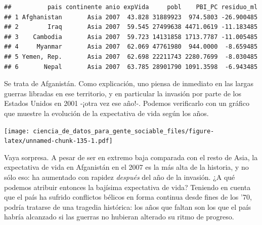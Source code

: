 \documentclass[spanish,]{book}
\newenvironment{Shaded}{\begin{snugshade}}{\end{snugshade}}
\newcommand{\DataTypeTok}[1]{\textcolor[rgb]{0.13,0.29,0.53}{#1}}
\newcommand{\KeywordTok}[1]{\textcolor[rgb]{0.13,0.29,0.53}{\textbf{#1}}}
\newcommand{\NormalTok}[1]{#1}
\newcommand{\OperatorTok}[1]{\textcolor[rgb]{0.81,0.36,0.00}{\textbf{#1}}}
\newcommand{\StringTok}[1]{\textcolor[rgb]{0.31,0.60,0.02}{#1}}
\begin{document}
\begin{verbatim}
##          pais continente anio expVida     pobl    PBI_PC residuo_ml
## 1 Afghanistan       Asia 2007  43.828 31889923  974.5803 -26.900485
## 2        Iraq       Asia 2007  59.545 27499638 4471.0619 -11.183485
## 3    Cambodia       Asia 2007  59.723 14131858 1713.7787 -11.005485
## 4     Myanmar       Asia 2007  62.069 47761980  944.0000  -8.659485
## 5 Yemen, Rep.       Asia 2007  62.698 22211743 2280.7699  -8.030485
## 6       Nepal       Asia 2007  63.785 28901790 1091.3598  -6.943485
\end{verbatim}

Se trata de Afganistán. Como explicación, uno piensa de inmediato en las largas guerras libradas en ese territorio, y en particular la invasión por parte de los Estados Unidos en 2001 -¡otra vez ese año!-. Podemos verificarlo con un gráfico que muestre la evolución de la expectativa de vida según los años.

\begin{Shaded}
\end{Shaded}

\texttt{[image: ciencia\_de\_datos\_para\_gente\_sociable\_files/figure-latex/unnamed-chunk-135-1.pdf]}

Vaya sorpresa. A pesar de ser en extremo baja comparada con el resto de Asia, la expectativa de vida en Afganistán en el 2007 es la más alta de la historia, y no sólo eso: ha aumentado con rapidez \emph{después} del año de la invasión. ¿A qué podemos atribuir entonces la bajísima expectativa de vida? Teniendo en cuenta que el país ha sufrido conflictos bélicos en forma continua desde fines de los '70, podría tratarse de una tragedia histórica: los años que faltan son los que el país habría alcanzado si las guerras no hubieran alterado su ritmo de progreso.
\end{document}
